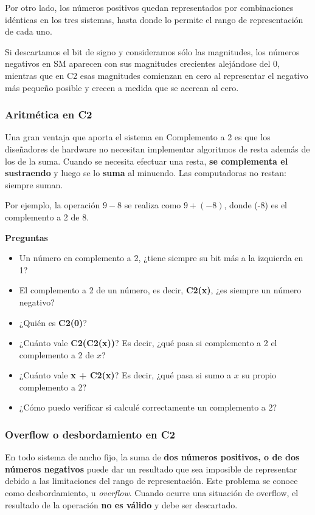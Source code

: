\documentclass[spanish,A4,]{article}
\begin{document}
Por otro lado, los números positivos quedan representados por
combinaciones idénticas en los tres sistemas, hasta donde lo permite el
rango de representación de cada uno.

Si descartamos el bit de signo y consideramos sólo las magnitudes, los
números negativos en SM aparecen con sus magnitudes crecientes
alejándose del 0, mientras que en C2 esas magnitudes comienzan en cero
al representar el negativo más pequeño posible y crecen a medida que se
acercan al cero.

\subsubsection{Aritmética en C2}\label{aritmuxe9tica-en-c2}

Una gran ventaja que aporta el sistema en Complemento a 2 es que los
diseñadores de hardware no necesitan implementar algoritmos de resta
además de los de la suma. Cuando se necesita efectuar una resta,
\textbf{se complementa el sustraendo} y luego se lo \textbf{suma} al
minuendo. Las computadoras no restan: siempre suman.

Por ejemplo, la operación $9 - 8$ se realiza como $9 + (-8)$, donde (-8)
es el complemento a 2 de 8.

\textbf{Preguntas}

\begin{itemize}
\itemsep1pt\parskip0pt
\item
  Un número en complemento a 2, ¿tiene siempre su bit más a la izquierda
  en 1?
\item
  El complemento a 2 de un número, es decir, \textbf{C2(x)}, ¿es siempre
  un número negativo?
\item
  ¿Quién es \textbf{C2(0)}?
\item
  ¿Cuánto vale \textbf{C2(C2(x))}? Es decir, ¿qué pasa si complemento a
  2 el complemento a 2 de $x$?
\item
  ¿Cuánto vale \textbf{x + C2(x)}? Es decir, ¿qué pasa si sumo a $x$ su
  propio complemento a 2?
\item
  ¿Cómo puedo verificar si calculé correctamente un complemento a 2?
\end{itemize}

\subsubsection{Overflow o desbordamiento en
C2}\label{overflow-o-desbordamiento-en-c2}

En todo sistema de ancho fijo, la suma de \textbf{dos números positivos,
o de dos números negativos} puede dar un resultado que sea imposible de
representar debido a las limitaciones del rango de representación. Este
problema se conoce como desbordamiento, u \emph{overflow}. Cuando ocurre
una situación de overflow, el resultado de la operación \textbf{no es
válido} y debe ser descartado.
\end{document}
